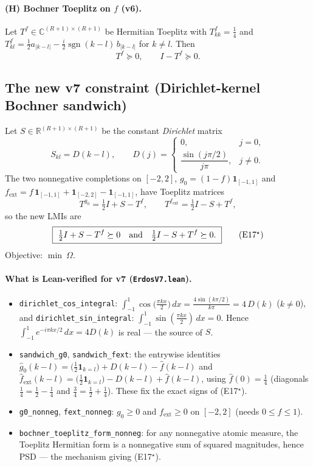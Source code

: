 \documentclass[11pt]{article}
\newcommand{\R}{\mathbb{R}}
\newcommand{\C}{\mathbb{C}}
\newcommand{\sgn}{\operatorname{sgn}}
\newcommand{\psdge}{\succeq 0}
\begin{document}
\paragraph{(H) Bochner Toeplitz on $f$ (v6).}
Let $T^{f}\in\C^{(R+1)\times(R+1)}$ be Hermitian Toeplitz with $T^{f}_{kk}=\tfrac14$
and $T^{f}_{kl}=\tfrac12 a_{|k-l|}-\tfrac{i}{2}\sgn(k-l)\,b_{|k-l|}$ for $k\ne l$.
Then
\begin{equation}
 T^{f}\psdge,\qquad I-T^{f}\psdge. \tag{E16}
\end{equation}

\subsection*{The new v7 constraint (Dirichlet-kernel Bochner sandwich)}
Let $S\in\R^{(R+1)\times(R+1)}$ be the constant \emph{Dirichlet} matrix
\[
 S_{kl}=D(k-l),\qquad
 D(j)=\begin{cases}0,& j=0,\\[2pt]\dfrac{\sin(j\pi/2)}{j\pi},& j\ne0.\end{cases}
\]
The two nonnegative completions on $[-2,2]$,
$g_0=(1-f)\mathbf 1_{[-1,1]}$ and
$f_{\mathrm{ext}}=f\,\mathbf 1_{[-1,1]}+\mathbf 1_{[-2,2]}-\mathbf 1_{[-1,1]}$,
have Toeplitz matrices
\[
 T^{g_0}=\tfrac12 I+S-T^{f},\qquad
 T^{f_{\mathrm{ext}}}=\tfrac12 I-S+T^{f},
\]
so the new LMIs are
\begin{equation}
\boxed{\ \tfrac12 I+S-T^{f}\psdge\quad\text{and}\quad \tfrac12 I-S+T^{f}\psdge.\ } \tag{E17$^{\star}$}
\end{equation}
Objective: $\min\ \Omega$.

\paragraph{What is Lean-verified for v7 (\texttt{ErdosV7.lean}).}
\begin{itemize}[nosep,leftmargin=1.4em]
\item \texttt{dirichlet\_cos\_integral}: $\displaystyle\int_{-1}^{1}\cos\!\big(\tfrac{\pi k x}{2}\big)\,dx=\frac{4\sin(k\pi/2)}{k\pi}=4\,D(k)$ ($k\ne0$), and
\texttt{dirichlet\_sin\_integral}: $\int_{-1}^{1}\sin(\tfrac{\pi kx}{2})\,dx=0$. Hence $\int_{-1}^1 e^{-i\pi kx/2}\,dx=4D(k)$ is real — the source of $S$.
\item \texttt{sandwich\_g0}, \texttt{sandwich\_fext}: the entrywise identities
$\hat g_0(k-l)=\big(\tfrac12\mathbf 1_{k=l}\big)+D(k-l)-\hat f(k-l)$ and
$\hat f_{\mathrm{ext}}(k-l)=\big(\tfrac12\mathbf 1_{k=l}\big)-D(k-l)+\hat f(k-l)$,
using $\hat f(0)=\tfrac14$ (diagonals $\tfrac14=\tfrac12-\tfrac14$ and $\tfrac34=\tfrac12+\tfrac14$). These fix the exact signs of (E17$^\star$).
\item \texttt{g0\_nonneg}, \texttt{fext\_nonneg}: $g_0\ge0$ and $f_{\mathrm{ext}}\ge0$ on $[-2,2]$ (needs $0\le f\le1$).
\item \texttt{bochner\_toeplitz\_form\_nonneg}: for any nonnegative atomic measure, the Toeplitz Hermitian form is a nonnegative sum of squared magnitudes, hence PSD — the mechanism giving (E17$^\star$).
\end{itemize}
\end{document}
